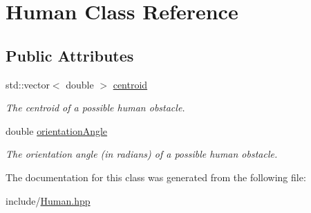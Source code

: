 \hypertarget{classHuman}{}\section{Human Class Reference}
\label{classHuman}
\subsection*{Public Attributes}
\begin{DoxyCompactItemize}
\item 
std\+::vector$<$ double $>$ \hyperlink{classHuman_a7978c0506328c34fdcbd883b8c5ee0cf}{centroid}\hypertarget{classHuman_a7978c0506328c34fdcbd883b8c5ee0cf}{}\label{classHuman_a7978c0506328c34fdcbd883b8c5ee0cf}

\begin{DoxyCompactList}\small\item\em The centroid of a possible human obstacle. \end{DoxyCompactList}\item 
double \hyperlink{classHuman_a27360de532f79f83fdfa810ffc1fc3db}{orientation\+Angle}\hypertarget{classHuman_a27360de532f79f83fdfa810ffc1fc3db}{}\label{classHuman_a27360de532f79f83fdfa810ffc1fc3db}

\begin{DoxyCompactList}\small\item\em The orientation angle (in radians) of a possible human obstacle. \end{DoxyCompactList}\end{DoxyCompactItemize}


The documentation for this class was generated from the following file\+:\begin{DoxyCompactItemize}
\item 
include/\hyperlink{Human_8hpp}{Human.\+hpp}\end{DoxyCompactItemize}
